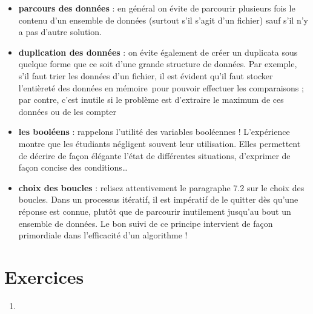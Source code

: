 \liststyleListi
\begin{itemize}
\item {
\textbf{parcours des données} : en général on évite de parcourir
plusieurs fois le contenu d’un ensemble de données (surtout s’il s’agit
d’un fichier) sauf s’il n’y a pas d’autre solution.}
\item {
\textbf{duplication des données} : on évite également de créer un
duplicata sous quelque forme que ce soit d’une grande structure de
données. Par exemple, s’il faut trier les données d’un fichier, il est
évident qu’il faut stocker l’entièreté des données en mémoire~pour
pouvoir effectuer les comparaisons ; par contre, c’est inutile si le
problème est d’extraire le maximum de ces données ou de les compter}
\item {
\textbf{les booléens} : rappelons l’utilité des variables booléennes !
L’expérience montre que les étudiants négligent souvent leur
utilisation. Elles permettent de décrire de façon élégante l’état de
différentes situations, d’exprimer de façon concise des conditions…}
\item {
\textbf{choix des boucles} : relisez attentivement le paragraphe 7.2 sur
le choix des boucles. Dans un processus itératif, il est impératif de
le quitter dès qu’une réponse est connue, plutôt que de parcourir
inutilement jusqu’au bout un ensemble de données. Le bon suivi de ce
principe intervient de façon primordiale dans l’efficacité d’un
algorithme ! }
\end{itemize}
\section{Exercices}
\liststyleExercice
\begin{enumerate}
\item {\sffamily\bfseries
{}}
\end{enumerate}
{
}

